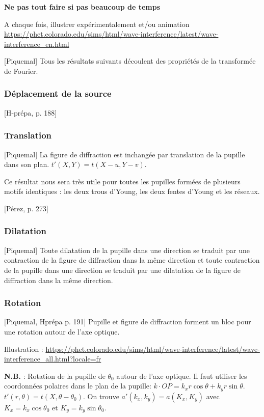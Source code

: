 \documentclass[11pt]{report}
\numberwithin{figure}{section}
\numberwithin{equation}{section}
\numberwithin{table}{section}
\newcommand{\1}{\boldsymbol{1}}
\begin{document}
\textbf{Ne pas tout faire si pas beaucoup de temps}

\textcolor{mycolor5}{A chaque fois, illustrer expérimentalement et/ou animation \url{https://phet.colorado.edu/sims/html/wave-interference/latest/wave-interference_en.html}}

[Piquemal] Tous les résultats suivants découlent des propriétés de la transformée de Fourier.

\subsubsection{Déplacement de la source}

[H-prépa, p. 188] 


\subsubsection{Translation}

[Piquemal] La figure de diffraction est inchangée par translation de la pupille dans son plan. $t'(X, Y) = t(X-u, Y-v)$.

Ce résultat nous sera très utile pour toutes les pupilles formées de plusieurs motifs identiques : les deux trous d’Young, les deux fentes d’Young et les réseaux.

[Pérez, p. 273]

\subsubsection{Dilatation}

[Piquemal] Toute dilatation de la pupille dans une direction se traduit par une contraction de la figure de diffraction dans la même direction et toute contraction de la pupille dans une direction se traduit par une dilatation de la figure de diffraction dans la même direction.


\subsubsection{Rotation}

[Piquemal, Hprépa p. 191] Pupille et figure de diffraction forment un bloc pour une rotation autour de l’axe optique. 

Illustration : \url{https://phet.colorado.edu/sims/html/wave-interference/latest/wave-interference_all.html?locale=fr}

\textbf{N.B.} : Rotation de la pupille de $\theta_0$ autour de l'axe optique. Il faut utiliser les coordonnées polaires dans le plan de la pupille: $k \cdot OP = k_x r \cos \theta + k_y r \sin \theta$. $t'(r,\theta) = t(X,\theta-\theta_0)$. On trouve $a'(k_x,k_y) = a(K_x,K_y)$ avec $K_x = k_x \cos \theta_0$ et $K_y = k_y \sin \theta_0$.
\end{document}

